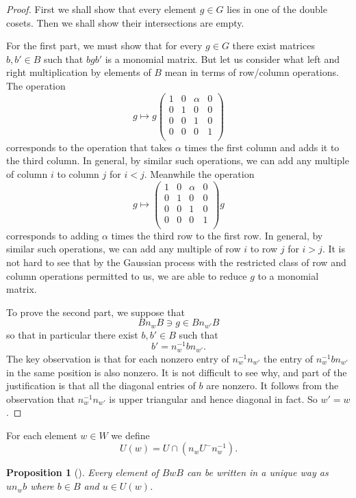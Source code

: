 \documentclass[12pt]{article}
\theoremstyle{plain}
\newtheorem{prop}[thm]{Proposition}
\theoremstyle{definition}
\numberwithin{equation}{section}
\begin{document}
\begin{proof}
First we shall show that every element $g \in G$ lies in one of the double cosets. Then we shall show their intersections are empty.

For the first part, we must show that for every $g \in G$ there exist matrices $b, b' \in B$ such that $bgb'$ is a monomial matrix. But let us consider what left and right multiplication by elements of $B$ mean in terms of row/column operations. The operation
\[
g \mapsto g \left(
\begin{array}{cccc}
1 & 0 & \alpha & 0 \\
0 & 1 & 0 & 0 \\
0 & 0 & 1 & 0 \\
0 & 0 & 0 & 1 \\
\end{array}
\right)
\]
corresponds to the operation that takes $\alpha$ times the first column and adds it to the third column. In general, by similar such operations, we can add any multiple of column $i$ to column $j$ for $i < j$. Meanwhile the operation
\[
g \mapsto \left(
\begin{array}{cccc}
1 & 0 & \alpha & 0 \\
0 & 1 & 0 & 0 \\
0 & 0 & 1 & 0 \\
0 & 0 & 0 & 1 \\
\end{array}
\right) g
\]
corresponds to adding $\alpha$ times the third row to the first row. In general, by similar such operations, we can add any multiple of row $i$ to row $j$ for $i > j$. It is not hard to see that by the Gaussian process with the restricted class of row and column operations permitted to us, we are able to reduce $g$ to a monomial matrix.

To prove the second part, we suppose that
\[
Bn_wB \ni g \in Bn_{w'}B
\]
so that in particular there exist $b, b' \in B$ such that
\[
b' = n_w^{-1} b n_{w'}.
\]
The key observation is that for each nonzero entry of $n_w^{-1} n_{w'}$ the entry of $n_w^{-1} b n_{w'}$ in the same position is also nonzero. It is not difficult to see why, and part of the justification is that all the diagonal entries of $b$ are nonzero. It follows from the observation that $n_w^{-1} n_{w'}$ is upper triangular and hence diagonal in fact. So $w' = w$.
\end{proof}




For each element $w \in W$ we define
\[
U(w) = U \cap (n_w U^- n_w^{-1}).
\]
\begin{prop}[{\cite[Corollary 23.60]{Fulton-Harris}}]
Every element of $B w B$ can be written in a unique way as $u n_w b$ where $b \in B$ and $u \in U(w)$.
\end{prop}
\end{document}
